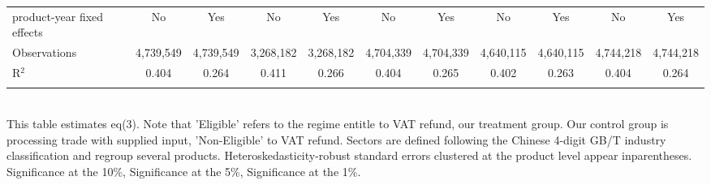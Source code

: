 \documentclass[preview]{standalone}
\begin{document}
\begin{table}[!htbp]
\begin{adjustbox}{width=\textwidth, totalheight=\baselineskip,keepaspectratio}
\begin{tabular}{@{\extracolsep{5pt}}lcccccccccc}
product-year fixed effects & No & Yes & No & Yes & No & Yes & No & Yes & No & Yes \\ 
Observations & 4,739,549 & 4,739,549 & 3,268,182 & 3,268,182 & 4,704,339 & 4,704,339 & 4,640,115 & 4,640,115 & 4,744,218 & 4,744,218 \\ 
R$^{2}$ & 0.404 & 0.264 & 0.411 & 0.266 & 0.404 & 0.265 & 0.402 & 0.263 & 0.404 & 0.264 \\ 
\hline 
\hline \\[-1.8ex] 
\end{tabular}
\end{adjustbox}
\begin{tablenotes} 
 \small 
 \item \\ 

This table estimates eq(3). 
Note that 'Eligible' refers to the regime entitle to VAT refund, our treatment group.
Our control group is processing trade with supplied input, 'Non-Eligible' to VAT refund.
Sectors are defined following the Chinese 4-digit GB/T industry
classification and regroup several products.
Heteroskedasticity-robust standard errors
clustered at the product level appear inparentheses.
\sym{*} Significance at the 10\%, \sym{**} Significance at the 5\%, \sym{***} Significance at the 1\%. 
\end{tablenotes}
\end{table}
\end{document}
